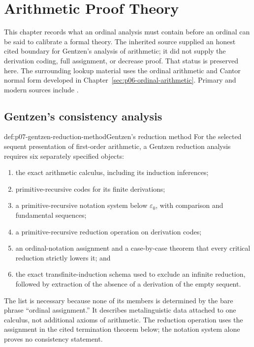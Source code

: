 
\chapter{Arithmetic Proof Theory}
\label{sec:p07-arithmetic-proof-theory}

This chapter records what an ordinal analysis must contain before an ordinal
can be said to calibrate a formal theory.  The inherited source supplied an
honest cited boundary for Gentzen's analysis of arithmetic; it did not supply
the derivation coding, full assignment, or decrease proof.  That status is
preserved here.  The surrounding lookup material uses the ordinal arithmetic
and Cantor normal form developed in
Chapter~\ref{sec:p06-ordinal-arithmetic}.  Primary and modern sources include
\cite{Gentzen1936,Gentzen1938,TroelstraSchwichtenberg2000,
Takeuti1987,Schwichtenberg1977}.

\section{Gentzen's consistency analysis}
\label{sec:p07-gentzen-analysis}

\begin{hbmethod}{def:p07-gentzen-reduction-method}{Gentzen's reduction method}
For the selected sequent presentation of first-order arithmetic, a Gentzen
reduction analysis requires six separately specified objects:
\begin{enumerate}
  \item the exact arithmetic calculus, including its induction inferences;
  \item primitive-recursive codes for its finite derivations;
  \item a primitive-recursive notation system below \(\varepsilon_0\), with
        comparison and fundamental sequences;
  \item a primitive-recursive reduction operation on derivation codes;
  \item an ordinal-notation assignment and a case-by-case theorem that every
        critical reduction strictly lowers it; and
  \item the exact transfinite-induction schema used to exclude an infinite
        reduction, followed by extraction of the absence of a derivation of
        the empty sequent.
\end{enumerate}
The list is necessary because none of its members is determined by the bare
phrase ``ordinal assignment.''  It describes metalinguistic data attached to
one calculus, not additional axioms of arithmetic.  The reduction operation
uses the assignment in the cited termination theorem below; the notation
system alone proves no consistency statement.
\end{hbmethod}

